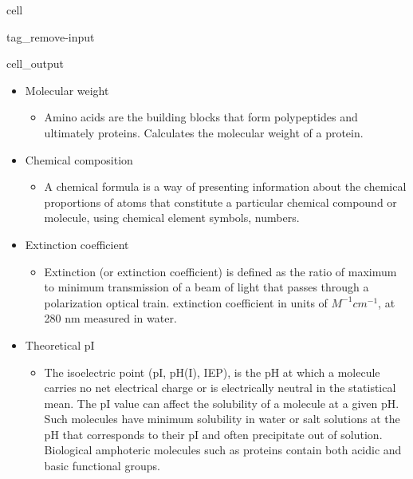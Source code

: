 \documentclass[letterpaper,10pt,english]{jupyterBook}
\begin{document}
\begin{sphinxuseclass}{cell}
\begin{sphinxuseclass}{tag_remove-input}\begin{sphinxVerbatimOutput}

\begin{sphinxuseclass}{cell_output}
\noindent{}

\end{sphinxuseclass}\end{sphinxVerbatimOutput}

\end{sphinxuseclass}
\end{sphinxuseclass}\begin{itemize}
\item {} 
\sphinxAtStartPar
Molecular weight
\begin{itemize}
\item {} 
\sphinxAtStartPar
Amino acids are the building blocks that form polypeptides and ultimately proteins. Calculates the molecular weight of a protein.

\end{itemize}

\item {} 
\sphinxAtStartPar
Chemical composition
\begin{itemize}
\item {} 
\sphinxAtStartPar
A chemical formula is a way of presenting information about the chemical proportions of atoms that constitute a particular chemical compound or molecule, using chemical element symbols, numbers.

\end{itemize}

\item {} 
\sphinxAtStartPar
Extinction coefficient
\begin{itemize}
\item {} 
\sphinxAtStartPar
Extinction (or extinction coefficient) is defined as the ratio of maximum to minimum transmission of a beam of light that passes through a polarization optical train. extinction coefficient in units of  \(M^{-1} cm^{-1}\), at 280 nm measured in water.

\end{itemize}

\item {} 
\sphinxAtStartPar
Theoretical pI
\begin{itemize}
\item {} 
\sphinxAtStartPar
The isoelectric point (pI, pH(I), IEP), is the pH at which a molecule carries no net electrical charge or is electrically neutral in the statistical mean. The pI value can affect the solubility of a molecule at a given pH. Such molecules have minimum solubility in water or salt solutions at the pH that corresponds to their pI and often precipitate out of solution. Biological amphoteric molecules such as proteins contain both acidic and basic functional groups.


\end{itemize}
\end{itemize}
\end{document}
